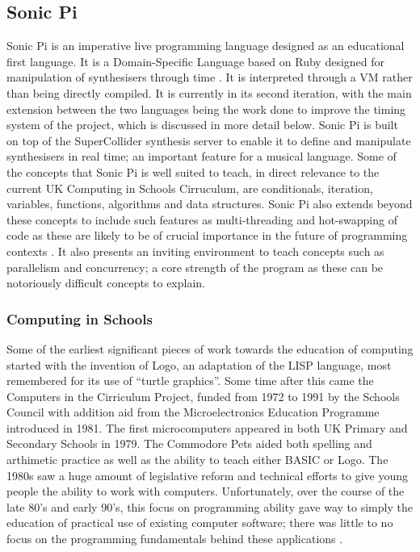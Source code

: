 \documentclass[11pt, abstracton, twoside, titlepage=true]{scrartcl}
\begin{document}
\subsection{Sonic Pi}
Sonic Pi is an imperative live programming language designed as an educational 
first language. It is a Domain-Specific Language based on Ruby designed for 
manipulation of synthesisers through time \cite{AB13}. It is interpreted through 
a VM rather than being directly compiled. It is currently in its 
second iteration, with the main extension between the two languages being the 
work done to improve the timing system of the project, which is discussed in 
more detail below. Sonic Pi is built on top of the SuperCollider synthesis 
server to enable it to define and manipulate synthesisers in real time; an 
important feature for a musical language. Some of the concepts that Sonic Pi 
is well suited to teach, in direct relevance to the current UK Computing in 
Schools Cirruculum, are conditionals, iteration, variables, functions, 
algorithms and data structures. Sonic Pi also extends beyond these concepts to 
include such features as multi-threading and hot-swapping of code as these are 
likely to be of crucial importance in the future of programming contexts \cite{
AOB14}. It also presents an inviting environment to teach concepts such as 
parallelism and concurrency; a core strength of the program as these can be
notoriously difficult concepts to explain.

\subsubsection{Computing in Schools}
Some of the earliest significant pieces of work towards the 
education of computing started with the invention of Logo, an adaptation of 
the LISP language, most remembered for its use of ``turtle graphics''. Some 
time after this came the Computers in the Cirriculum Project, funded from 
1972 to 1991 by the Schools Council with addition aid from the Microelectronics 
Education Programme introduced in 1981. The first microcomputers appeared in 
both UK Primary and Secondary Schools in 1979. The Commodore Pets aided both 
spelling and arthimetic practice as well as the ability to teach either BASIC or 
Logo. The 1980s saw a huge amount of legislative reform and technical efforts 
to give young people the ability to work with computers. Unfortunately, over the 
course of the late 80's and early 90's, this focus on programming ability gave 
way to simply the education of practical use of existing computer software; 
there was little to no focus on the programming fundamentals behind 
these applications \cite{naec}.
\end{document}

